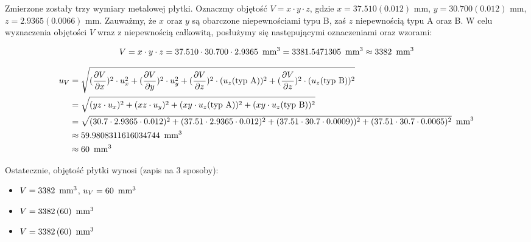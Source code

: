 \documentclass[a4paper]{article}
\begin{document}
Zmierzone zostały trzy wymiary metalowej płytki.
Oznaczmy objętość $V = x \cdot y \cdot z$, gdzie $x = 37.510 (0.012)$ mm, $y = 30.700 (0.012)$ mm, $z = 2.9365 (0.0066)$ mm.
Zauważmy, że $x$ oraz $y$ są obarczone niepewnościami typu B, zaś $z$ niepewnością typu A oraz B.
W celu wyznaczenia objętości $V$ wraz z niepewnością całkowitą, posłużymy się następującymi oznaczeniami oraz wzorami:

$$V = x \cdot y \cdot z = 37.510 \cdot 30.700 \cdot 2.9365 \enskip \text{mm}^3 = 3381.5471305 \enskip \text{mm}^3 \approx 3382 \enskip \text{mm}^3$$

\begin{align*}
u_V &= \sqrt{(\frac{\partial V}{\partial x})^2 \cdot u_x^2 + (\frac{\partial V}{\partial y})^2 \cdot u_y^2 + (\frac{\partial V}{\partial z})^2 \cdot (u_z \text{(typ A)})^2 + (\frac{\partial V}{\partial z})^2 \cdot (u_z \text{(typ B)})^2} \\
	&= \sqrt{(yz \cdot u_x)^2 + (xz \cdot u_y)^2 + (xy \cdot u_z \text{(typ A)})^2 + (xy \cdot u_z \text{(typ B)})^2} \\
	&= \sqrt{(30.7 \cdot 2.9365 \cdot 0.012)^2 + (37.51 \cdot 2.9365 \cdot 0.012)^2 + (37.51 \cdot 30.7 \cdot 0.0009))^2 + (37.51 \cdot 30.7 \cdot 0.0065)^2} \enskip \text{mm}^3\\
	&\approx 59.9808311616034744 \enskip \text{mm}^3 \\
	&\approx 60 \enskip \text{mm}^3
\end{align*}

Ostatecznie, objętość płytki wynosi (zapis na 3 sposoby):

\begin{itemize}
\item $V = 3382 \enskip \text{mm}^3$, $u_V = 60 \enskip \text{mm}^3$
\item $V = 3382 \, (60) \enskip \text{mm}^3$
\item $V = 3382 \, (60) \enskip \text{mm}^3$
\end{itemize}
\end{document}
